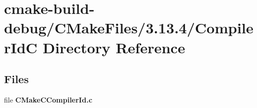 \section{cmake-\/build-\/debug/\+C\+Make\+Files/3.13.4/\+Compiler\+IdC Directory Reference}
\label{dir_a079a9f5ea62c5f2928094a4340fb647}
\subsection*{Files}
\begin{DoxyCompactItemize}
\item 
file {\bf C\+Make\+C\+Compiler\+Id.\+c}
\end{DoxyCompactItemize}
